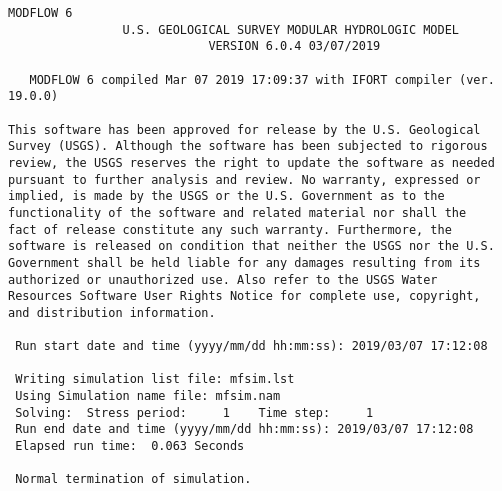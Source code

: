 {\small
\begin{lstlisting}[style=modeloutput]
                                   MODFLOW 6
                U.S. GEOLOGICAL SURVEY MODULAR HYDROLOGIC MODEL
                            VERSION 6.0.4 03/07/2019

   MODFLOW 6 compiled Mar 07 2019 17:09:37 with IFORT compiler (ver. 19.0.0)

This software has been approved for release by the U.S. Geological
Survey (USGS). Although the software has been subjected to rigorous
review, the USGS reserves the right to update the software as needed
pursuant to further analysis and review. No warranty, expressed or
implied, is made by the USGS or the U.S. Government as to the
functionality of the software and related material nor shall the
fact of release constitute any such warranty. Furthermore, the
software is released on condition that neither the USGS nor the U.S.
Government shall be held liable for any damages resulting from its
authorized or unauthorized use. Also refer to the USGS Water
Resources Software User Rights Notice for complete use, copyright,
and distribution information.

 Run start date and time (yyyy/mm/dd hh:mm:ss): 2019/03/07 17:12:08

 Writing simulation list file: mfsim.lst
 Using Simulation name file: mfsim.nam
 Solving:  Stress period:     1    Time step:     1
 Run end date and time (yyyy/mm/dd hh:mm:ss): 2019/03/07 17:12:08
 Elapsed run time:  0.063 Seconds

 Normal termination of simulation.

\end{lstlisting}
}
